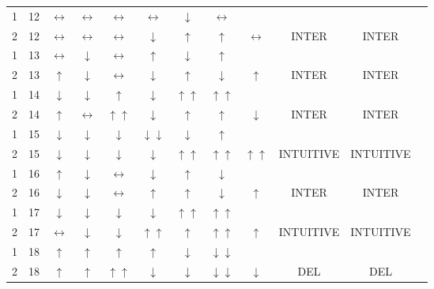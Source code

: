 \documentclass[12pt]{article}
\begin{document}
\begin{table}[htp]
\begin{tabular}{cccccccccccc}
\rowcolor{lightgray} 
1&12&$\leftrightarrow$&$\leftrightarrow$&$\leftrightarrow$&$\leftrightarrow$&$\downarrow$&$\leftrightarrow$ &&&\\
\rowcolor{lightgray} 
2&12&$\leftrightarrow$&$\leftrightarrow$&$\leftrightarrow$&$\downarrow$&$\uparrow$&$\uparrow$ &\multirow{-2}{*}{$\leftrightarrow$}&\multirow{-2}{*}{INTER}&\multirow{-2}{*}{INTER} \\

1&13&$\leftrightarrow$&$\downarrow$&$\leftrightarrow$&$\uparrow$&$\downarrow$&$\uparrow$ &&&\\
2&13&$\uparrow$&$\downarrow$&$\leftrightarrow$&$\downarrow$&$\uparrow$&$\downarrow$& \multirow{-2}{*}{$\uparrow$}&\multirow{-2}{*}{INTER}&\multirow{-2}{*}{INTER} \\

\rowcolor{lightgray} 
1&14&$\downarrow$&$\downarrow$&$\uparrow$&$\downarrow$&$\uparrow\uparrow$&$\uparrow\uparrow$ &&&\\
\rowcolor{lightgray} 
2&14&$\uparrow$&$\leftrightarrow$&$\uparrow\uparrow$&$\downarrow$&$\uparrow$&$\uparrow$ & \multirow{-2}{*}{$\downarrow$}&\multirow{-2}{*}{INTER}&\multirow{-2}{*}{INTER} \\

1&15&$\downarrow$&$\downarrow$&$\downarrow$&$\downarrow\downarrow$&$\downarrow$&$\uparrow$ &&&\\
2&15&$\downarrow$&$\downarrow$&$\downarrow$&$\downarrow$&$\uparrow\uparrow$&$\uparrow\uparrow$ &\multirow{-2}{*}{$\uparrow\uparrow$}&\multirow{-2}{*}{INTUITIVE}&\multirow{-2}{*}{INTUITIVE}\\

\rowcolor{lightgray} 
1&16&$\uparrow$&$\downarrow$&$\leftrightarrow$&$\downarrow$&$\uparrow$&$\downarrow$ &&& \\
\rowcolor{lightgray} 
2&16&$\downarrow$&$\downarrow$&$\leftrightarrow$&$\uparrow$&$\uparrow$&$\downarrow$&\multirow{-2}{*}{$\uparrow$}&\multirow{-2}{*}{INTER}&\multirow{-2}{*}{INTER}\\

1&17&$\downarrow$&$\downarrow$&$\downarrow$&$\downarrow$&$\uparrow\uparrow$&$\uparrow\uparrow$ &&&\\
2&17&$\leftrightarrow$&$\downarrow$&$\downarrow$&$\uparrow\uparrow$&$\uparrow$&$\uparrow\uparrow$ &\multirow{-2}{*}{$\uparrow$} &
\multirow{-2}{*}{INTUITIVE}& \multirow{-2}{*}{INTUITIVE}\\

\rowcolor{lightgray} 
1&18&$\uparrow$&$\uparrow$&$\uparrow$&$\uparrow$&$\downarrow$&$\downarrow\downarrow$ &&&\\
\rowcolor{lightgray} 
2&18&$\uparrow$&$\uparrow$&$\uparrow\uparrow$&$\downarrow$&$\downarrow$&$\downarrow\downarrow$ &\multirow{-2}{*}{$\downarrow$}& \multirow{-2}{*}{DEL} & \multirow{-2}{*}{DEL}\\


\end{tabular}
\end{table}
\end{document}
